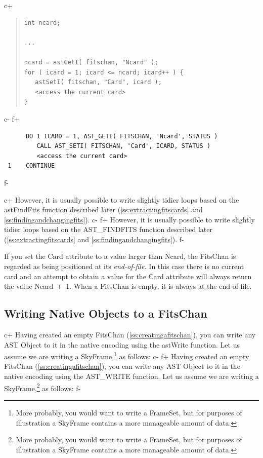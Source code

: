 \documentclass[twoside,11pt]{article}
\newcommand{\secref}[1]{\S\ref{#1}}
\renewcommand{\secref}[1]{\ref{#1}}
\begin{document}
c+
\begin{quote}
\small
\begin{verbatim}
int ncard;

...

ncard = astGetI( fitschan, "Ncard" );
for ( icard = 1; icard <= ncard; icard++ ) {
   astSetI( fitschan, "Card", icard );
   <access the current card>
}
\end{verbatim}
\normalsize
\end{quote}
c-
f+
\small
\begin{verbatim}
      DO 1 ICARD = 1, AST_GETI( FITSCHAN, 'Ncard', STATUS )
         CALL AST_SETI( FITSCHAN, 'Card', ICARD, STATUS )
         <access the current card>
 1    CONTINUE
\end{verbatim}
\normalsize
f-

c+
However, it is usually possible to write slightly tidier loops based
on the astFindFits function described later
(\secref{ss:extractingfitscards} and
\secref{ss:findingandchangingfits}).
c-
f+
However, it is usually possible to write slightly tidier loops based
on the AST\_FINDFITS function described later
(\secref{ss:extractingfitscards} and
\secref{ss:findingandchangingfits}).
f-

If you set the Card attribute to a value larger than Ncard, the
FitsChan is regarded as being positioned at its {\em{end-of-file.}} In
this case there is no current card and an attempt to obtain a value
for the Card attribute will always return the value Ncard~$+$~1. When
a FitsChan is empty, it is always at the end-of-file.
 
\subsection{\label{ss:writingnativefits}Writing Native Objects to a FitsChan}

c+
Having created an empty FitsChan (\secref{ss:creatingafitschan}), you
can write any AST Object to it in the native encoding using the
astWrite function. Let us assume we are writing a
SkyFrame,\footnote{More probably, you would want to write a FrameSet,
but for purposes of illustration a SkyFrame contains a more manageable
amount of data.} as follows:
c-
f+
Having created an empty FitsChan (\secref{ss:creatingafitschan}), you
can write any AST Object to it in the native encoding using the
AST\_WRITE function. Let us assume we are writing a
SkyFrame,\footnote{More probably, you would want to write a FrameSet,
but for purposes of illustration a SkyFrame contains a more manageable
amount of data.} as follows:
f-
\end{document}
